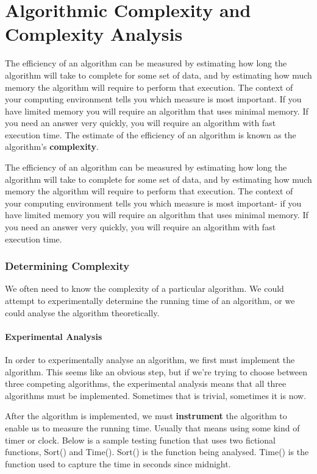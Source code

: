 

\chapter{Algorithmic Complexity and Complexity Analysis}

The efficiency of an algorithm can be measured by estimating how long the algorithm will take to complete for some set of data, and by
estimating how much memory the algorithm will require to perform that execution. The context of your computing environment tells you which
measure is most important. If you have limited memory you will require an algorithm that uses minimal memory. If you need an answer very
quickly, you will require an algorithm with fast execution time.   The estimate of the efficiency of an algorithm is known as the algorithm's \textbf{complexity}.



The efficiency of an algorithm can be measured by estimating how long the algorithm will take to complete for some set of data, and by
estimating how much memory the algorithm will require to perform that
execution. The context of your computing environment tells you which
measure is most important- if you have limited memory you will require
an algorithm that uses minimal memory. If you need an answer very
quickly, you will require an algorithm with fast execution time.\\


\subsection{Determining Complexity}

We often need to know the complexity of a particular algorithm.     We could attempt to experimentally determine the running time of an algorithm,  or we could analyse the algorithm theoretically.   


\subsubsection{Experimental Analysis}

In order to experimentally analyse an algorithm, we first must implement the algorithm.  This seems like an obvious step, but if we're trying to choose between three competing algorithms,  the experimental analysis means that all three algorithms must be implemented.    Sometimes that is trivial,  sometimes it is now.

After the algorithm is implemented,  we must \textbf{instrument} the algorithm to enable us to measure the running time.   Usually that means using  some kind of timer or clock.       Below is a sample testing function that uses two fictional functions,  Sort() and Time().  Sort() is the function being analysed.  Time() is the function used to capture the time in seconds since midnight.   

